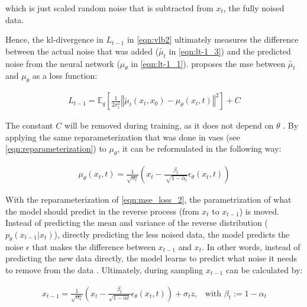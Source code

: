which is just scaled random noise that is subtracted from $x_t$, the fully noised data.

Hence, the \gls{kl}-divergence in $L_{t-1}$ in \autoref{eqn:vlb2} ultimately measures the difference between the actual noise that was added ($\tilde{\mu_t}$ in \autoref{eqn:lt-1_3}) and the predicted noise from the neural network ($\mu_\theta$ in \autoref{eqn:lt-1_1}).
\textcite{ho2020DenoisingDiffusionProbabilistic} proposes the \gls{mse} between $\tilde{\mu_t}$ and $\mu_\theta$ as a loss function:

\begin{equation}
  \begin{align}
    \label{eqn:mse_loss}
    L_{t-1} = \mathbb{E}_q \left[ \frac{1}{2\sigma_t^2} \left\Vert \tilde{\mu}_t(x_t, x_0) - \mu_\theta(x_t, t) \right\Vert^2 \right] + C
  \end{align}
\end{equation}

The constant $C$ will be removed during training, as it does not depend on $\theta$ \cite{ho2020DenoisingDiffusionProbabilistic}.
By applying the same reparameterization that was done in \glspl{vae} (see \autoref{eqn:reparameterization}) to $\mu_\theta$, it can be reformulated in the following way:

\begin{equation}
  \begin{align}
    \label{eqn:mse_loss_2}
    \mu_\theta(x_t,t)= \frac{1}{\sqrt{\alpha_t}}(x_t - \frac{\beta_t}{\sqrt[]{1-\bar{\alpha}_t}}\epsilon_\theta(x_t,t)) 
  \end{align}
\end{equation}

With the reparameterization of \autoref{eqn:mse_loss_2}, the parametrization of what the model should predict in the reverse process (from $x_t$ to $x_{t-1}$) is moved. 
Instead of predicting the mean and variance of the reverse distribution ($p_\theta(x_{t-1}|x_t)$), \ie directly predicting the less noised data, 
the model predicts the noise $\epsilon$ that makes the difference between $x_{t-1}$ and ${x_t}$.
In other words, instead of predicting the new data directly, the model learns to predict what noise it needs to remove from the data \cite{capel2022MasterThesisDenoising}.
Ultimately, during sampling $x_{t-1}$ can be calculated by:

\begin{equation}
  \begin{align*}
    \label{eqn:xt-1}
    x_{t-1} = \frac{1}{\sqrt{\alpha_t}}\left(x_t - \frac{\beta_t}{\sqrt{1-\bar{\alpha}t}}\epsilon_{\theta}(x_t,t)\right) + \sigma_t z \textrm{,}\quad
    \textrm{with } \beta_t := 1-\alpha_t
  \end{align*}
\end{equation}

